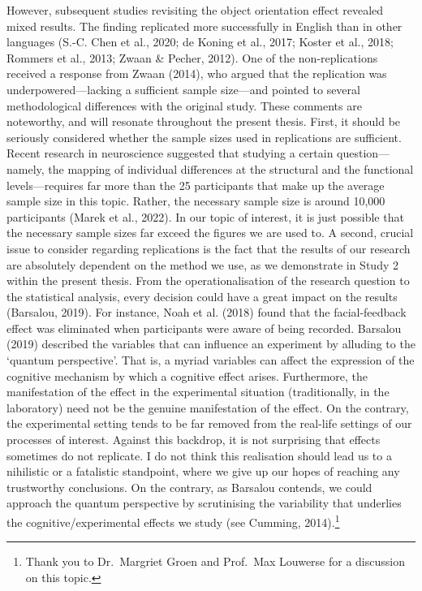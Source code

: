 \documentclass[
  12pt,
  man,floatsintext]{apa7}
\begin{document}
However, subsequent studies revisiting the object orientation effect revealed mixed results. The finding replicated more successfully in English than in other languages (S.-C. Chen et al., 2020; de Koning et al., 2017; Koster et al., 2018; Rommers et al., 2013; Zwaan \& Pecher, 2012). One of the non-replications received a response from Zwaan (2014), who argued that the replication was underpowered---lacking a sufficient sample size---and pointed to several methodological differences with the original study. These comments are noteworthy, and will resonate throughout the present thesis. First, it should be seriously considered whether the sample sizes used in replications are sufficient. Recent research in neuroscience suggested that studying a certain question---namely, the mapping of individual differences at the structural and the functional levels---requires far more than the 25 participants that make up the average sample size in this topic. Rather, the necessary sample size is around 10,000 participants (Marek et al., 2022). In our topic of interest, it is just possible that the necessary sample sizes far exceed the figures we are used to. A second, crucial issue to consider regarding replications is the fact that the results of our research are absolutely dependent on the method we use, as we demonstrate in Study 2 within the present thesis. From the operationalisation of the research question to the statistical analysis, every decision could have a great impact on the results (Barsalou, 2019). For instance, Noah et al. (2018) found that the facial-feedback effect was eliminated when participants were aware of being recorded. Barsalou (2019) described the variables that can influence an experiment by alluding to the `quantum perspective'. That is, a myriad variables can affect the expression of the cognitive mechanism by which a cognitive effect arises. Furthermore, the manifestation of the effect in the experimental situation (traditionally, in the laboratory) need not be the genuine manifestation of the effect. On the contrary, the experimental setting tends to be far removed from the real-life settings of our processes of interest. Against this backdrop, it is not surprising that effects sometimes do not replicate. I do not think this realisation should lead us to a nihilistic or a fatalistic standpoint, where we give up our hopes of reaching any trustworthy conclusions. On the contrary, as Barsalou contends, we could approach the quantum perspective by scrutinising the variability that underlies the cognitive/experimental effects we study (see Cumming, 2014).\footnote{Thank you to Dr.~Margriet Groen and Prof.~Max Louwerse for a discussion on this topic.}
\end{document}
